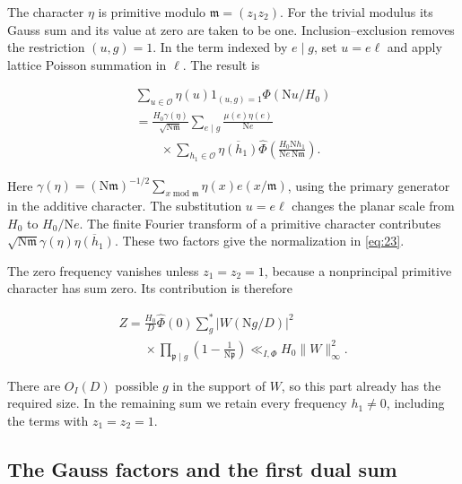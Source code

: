 \documentclass[reqno,a4paper,11pt]{amsart}
\begin{document}
The character $\eta$ is primitive modulo $\mathfrak{m}=(z_1z_2)$. For the trivial modulus its Gauss sum and its value at zero are taken to be one. Inclusion--exclusion removes the restriction $(u,g)=1$. In the term indexed by $e\mid g$, set $u=e\ell$ and apply lattice Poisson summation in $\ell$. The result is

\begin{equation}\label{eq:23}
\begin{gathered}
\sum_{u\in\mathcal{O}}\eta(u)1_{(u,g)=1}\Phi(\mathrm{N}u/H_0) \\ =\frac{H_0\gamma(\eta)}{\sqrt{\mathrm{N}\mathfrak{m}}}\sum_{e\mid g}\frac{\mu(e)\eta(e)}{\mathrm{N}e} \\ \qquad\times\sum_{h_1\in\mathcal{O}}\overline{\eta(h_1)}\widehat{\Phi}\left(\frac{H_0\mathrm{N}h_1}{\mathrm{N}e\,\mathrm{N}\mathfrak{m}}\right).
\end{gathered}
\end{equation}

Here $\gamma(\eta)=(\mathrm{N}\mathfrak{m})^{-1/2}\sum_{x\;\mathrm{mod}\;\mathfrak{m}}\eta(x)e(x/\mathfrak{m})$, using the primary generator in the additive character. The substitution $u=e\ell$ changes the planar scale from $H_0$ to $H_0/\mathrm{N}e$. The finite Fourier transform of a primitive character contributes $\sqrt{\mathrm{N}\mathfrak{m}}\gamma(\eta)\overline{\eta(h_1)}$. These two factors give the normalization in \eqref{eq:23}.

The zero frequency vanishes unless $z_1=z_2=1$, because a nonprincipal primitive character has sum zero. Its contribution is therefore

\begin{equation}\label{eq:zero-frequency}
\begin{gathered}
Z=\frac{H_0}{D}\widehat{\Phi}(0)\sum_g^*|W(\mathrm{N}g/D)|^2 \\ \qquad\times\prod_{\mathfrak{p}\mid g}\left(1-\frac{1}{\mathrm{N}\mathfrak{p}}\right)\ll_{I,\Phi}H_0\|W\|_{\infty}^2.
\end{gathered}
\end{equation}

There are $O_I(D)$ possible $g$ in the support of $W$, so this part already has the required size. In the remaining sum we retain every frequency $h_1\ne0$, including the terms with $z_1=z_2=1$.

\subsection*{The Gauss factors and the first dual sum}
\end{document}
